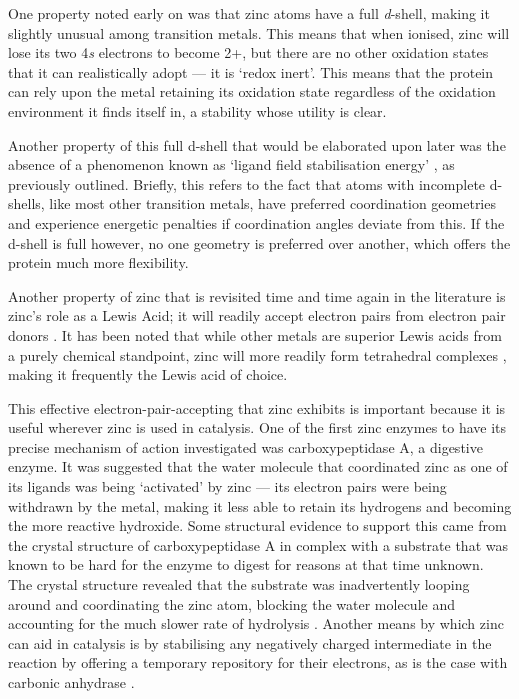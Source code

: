 One property noted early on was that zinc atoms have a full \textit{d}-shell, making it slightly unusual among transition metals\cite{vallee1984metallobiochemistry}. This means that when ionised, zinc will lose its two 4\textit{s} electrons to become 2+, but there are no other oxidation states that it can realistically adopt --- it is `redox inert'. This means that the protein can rely upon the metal retaining its oxidation state regardless of the oxidation environment it finds itself in, a stability whose utility is clear.

Another property of this full d-shell that would be elaborated upon later was the absence of a phenomenon known as `ligand field stabilisation energy' \cite{lachenmann2004zinc,vahrenkamp2007does,maret2009coordination,krkezel2016biological}, as previously outlined. Briefly, this refers to the fact that atoms with incomplete d-shells, like most other transition metals, have preferred coordination geometries and experience energetic penalties if coordination angles deviate from this. If the d-shell is full however, no one geometry is preferred over another, which offers the protein much more flexibility.

Another property of zinc that is revisited time and time again in the literature is zinc's role as a Lewis Acid; it will readily accept electron pairs from electron pair donors \cite{williams1984zinc}. It has been noted that while other metals are superior Lewis acids from a purely chemical standpoint, zinc will more readily form tetrahedral complexes \cite{bertini1985zinc}, making it frequently the Lewis acid of choice.

This effective electron-pair-accepting that zinc exhibits is important because it is useful wherever zinc is used in catalysis. One of the first zinc enzymes to have its precise mechanism of action investigated was carboxypeptidase A, a digestive enzyme. It was suggested that the water molecule that coordinated zinc as one of its ligands was being `activated' by zinc --- its electron pairs were being withdrawn by the metal, making it less able to retain its hydrogens and becoming the more reactive hydroxide. Some structural evidence to support this came from the crystal structure of carboxypeptidase A in complex with a substrate that was known to be hard for the enzyme to digest for reasons at that time unknown. The crystal structure revealed that the substrate was inadvertently looping around and coordinating the zinc atom, blocking the water molecule and accounting for the much slower rate of hydrolysis \cite{christianson1986x}. Another means by which zinc can aid in catalysis is by stabilising any negatively charged intermediate in the reaction by offering a temporary repository for their electrons, as is the case with carbonic anhydrase \cite{christianson1996carbonic}.

